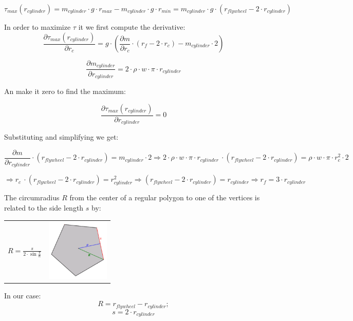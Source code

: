 \[ \tau _{max} (r_{cylinder}) =  m_{cylinder} \cdot g \cdot r_{max} -  m_{cylinder} \cdot g \cdot r_{min} =
	m_{cylinder}\cdot g \cdot (r_{flywheel} - 2 \cdot r_{cylinder}) \]

In order to maximize $\tau$ it we first compute the derivative:
\[\frac{\partial \tau _{max} (r_{cylinder})}{\partial r_c} = g \cdot(\frac{\partial m}{\partial r_c} \cdot (r_f - 2 \cdot r_c) -  m_{cylinder} \cdot 2)\]

\[ \frac{\partial  m_{cylinder}}{\partial r_{cylinder}} = 2 \cdot \rho \cdot w \cdot \pi \cdot  r_{cylinder}\]

An make it zero to find the maximum:

\[\frac{\partial \tau _{max} (r_{cylinder})}{\partial r_{cylinder}} = 0\]

Substituting and simplifying we get:

\[\frac{\partial m}{\partial r_{cylinder}} \cdot (r_{flywheel} - 2 \cdot r_{cylinder}) =
	m_{cylinder} \cdot 2 \Rightarrow 2 \cdot \rho \cdot w \cdot \pi \cdot  r_{cylinder}\ \cdot (r_{flywheel} - 2 \cdot r_{cylinder}) = \rho \cdot w \cdot \pi \cdot r_c^2 \cdot 2 \]

\[ \Rightarrow r_c\ \cdot (r_{flywheel} - 2 \cdot r_{cylinder}) =  r_{cylinder}^2
	\Rightarrow (r_{flywheel} - 2 \cdot r_{cylinder}) =  r_{cylinder}
	\Rightarrow \boxed{r_f = 3 \cdot r_{cylinder}}\]


The circumradius $R$ from the center of a regular polygon to one of the vertices is related to the side length $s$ by:

\begin{center}
	\begin{tabular}{ c  c }
		\(\displaystyle R=\frac {s}{2\cdot \sin{\frac {\pi} {n}}} \)
		 &
		\includegraphics[width=3cm]{img/PolygonParameters.png}
	\end{tabular}
\end{center}

In our case:
\[ R = r_{flywheel} - r_{cylinder}; \]
\[ s = 2 \cdot r_{cylinder}\]

